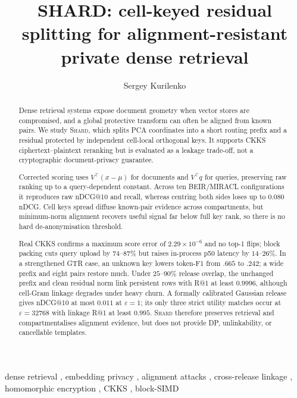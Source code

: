 \documentclass[review]{elsarticle}
\begin{document}
\begin{frontmatter}

\title{SHARD: cell-keyed residual splitting for alignment-resistant private dense retrieval}
\author{Sergey Kurilenko}
\address{Moscow Institute of Physics and Technology (MIPT),
Dolgoprudny 141701, Russia}

\begin{abstract}
Dense retrieval systems expose document geometry when vector stores are
compromised, and a global protective transform can often be aligned from
known pairs. We study \textsc{Shard}, which splits PCA coordinates into a
short routing prefix and a residual protected by independent cell-local
orthogonal keys. It supports CKKS ciphertext--plaintext reranking but is
evaluated as a leakage trade-off, not a cryptographic document-privacy
guarantee.

Corrected scoring uses $V^\top(x-\mu)$ for documents and $V^\top q$ for
queries, preserving raw ranking up to a query-dependent constant. Across ten
BEIR/MIRACL configurations it reproduces raw nDCG@10 and recall, whereas
centring both sides loses up to $0.080$ nDCG. Cell keys spread diffuse
known-pair evidence across compartments, but minimum-norm alignment recovers
useful signal far below full key rank, so there is no hard de-anonymisation
threshold.

Real CKKS confirms a maximum score error of $2.29\times10^{-6}$ and no top-1
flips; block packing cuts query upload by $74$--$87\%$ but raises in-process
p50 latency by $14$--$26\%$. In a strengthened GTR case, an unknown key lowers
token-F1 from $.665$ to $.242$; a wide prefix and eight pairs restore much.
Under $25$--$90\%$ release overlap, the unchanged prefix and clean residual
norm link persistent rows with R@1 at least $0.9996$, although cell-Gram
linkage degrades under heavy churn. A formally calibrated Gaussian release
gives nDCG@10 at most $0.011$ at $\varepsilon=1$; its only three strict
utility matches occur at $\varepsilon=32768$ with linkage R@1 at least
$0.995$. \textsc{Shard} therefore preserves retrieval and compartmentalises
alignment evidence, but does not provide DP, unlinkability, or cancellable
templates.
\end{abstract}

\begin{keyword}
dense retrieval \sep
embedding privacy \sep
alignment attacks \sep
cross-release linkage \sep
homomorphic encryption \sep
CKKS \sep
block-SIMD
\end{keyword}

\end{frontmatter}



\end{document}
